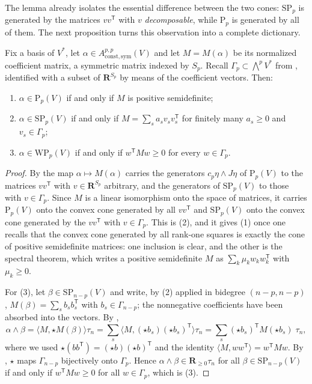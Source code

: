 The lemma already isolates the essential difference between the two cones:
$\mathrm{SP}_p$ is generated by the matrices $vv^{\mathsf T}$ with $v$
\emph{decomposable}, while $\mathrm{P}_p$ is generated by all of them.  The
next proposition turns this observation into a complete dictionary.

\begin{proposition}
\label{prop:ch09-positivity-dictionary}
Fix a basis of $V^*$, let
$\alpha\in A_{\mathrm{const},\mathrm{sym}}^{p,p}(V)$ and let
$M=M(\alpha)$ be its normalized coefficient matrix, a symmetric matrix
indexed by $S_p$.  Recall $\Gamma_p\subset\bigwedge^pV^*$ from
, identified with a subset of $\mathbf R^{S_p}$ by
means of the coefficient vectors.  Then:
\begin{enumerate}
\item $\alpha\in\mathrm{P}_p(V)$ if and only if $M$ is positive
  semidefinite;
\item $\alpha\in\mathrm{SP}_p(V)$ if and only if
  $M=\sum_sa_sv_sv_s^{\mathsf T}$ for finitely many $a_s\geq0$ and
  $v_s\in\Gamma_p$;
\item $\alpha\in\mathrm{WP}_p(V)$ if and only if $w^{\mathsf T}Mw\geq0$ for
  every $w\in\Gamma_p$.
\end{enumerate}
\end{proposition}

\begin{proof}
By  the map $\alpha\mapsto M(\alpha)$ carries the
generators $c_p\eta\wedge J\eta$ of $\mathrm{P}_p(V)$ to the matrices
$vv^{\mathsf T}$ with $v\in\mathbf R^{S_p}$ arbitrary, and the generators of
$\mathrm{SP}_p(V)$ to those with $v\in\Gamma_p$.  Since $M$ is a linear
isomorphism onto the space of matrices, it carries $\mathrm{P}_p(V)$ onto
the convex cone generated by all $vv^{\mathsf T}$ and $\mathrm{SP}_p(V)$ onto
the convex cone generated by the $vv^{\mathsf T}$ with $v\in\Gamma_p$.  This
is (2), and it gives (1) once one recalls that the convex cone generated by
all rank-one squares is exactly the cone of positive semidefinite matrices:
one inclusion is clear, and the other is the spectral theorem, which writes a
positive semidefinite $M$ as $\sum_k\mu_kw_kw_k^{\mathsf T}$ with
$\mu_k\geq0$.

For (3), let $\beta\in\mathrm{SP}_{n-p}(V)$ and write, by (2) applied in
bidegree $(n-p,n-p)$, $M(\beta)=\sum_sb_sb_s^{\mathsf T}$ with
$b_s\in\Gamma_{n-p}$; the nonnegative coefficients have been absorbed into
the vectors.  By ,
\[
 \alpha\wedge\beta
 =\bigl\langle M,\star M(\beta)\bigr\rangle\tau_n
 =\sum_s\bigl\langle M,(\star b_s)(\star b_s)^{\mathsf T}\bigr\rangle\tau_n
 =\sum_s(\star b_s)^{\mathsf T}M(\star b_s)\;\tau_n,
\]
where we used $\star(bb^{\mathsf T})=(\star b)(\star b)^{\mathsf T}$ and the
identity $\langle M,ww^{\mathsf T}\rangle=w^{\mathsf T}Mw$.  By
, $\star$ maps $\Gamma_{n-p}$ bijectively
onto $\Gamma_p$.  Hence $\alpha\wedge\beta\in\mathbf R_{\geq0}\tau_n$ for all
$\beta\in\mathrm{SP}_{n-p}(V)$ if and only if $w^{\mathsf T}Mw\geq0$ for all
$w\in\Gamma_p$, which is (3).
\end{proof}

